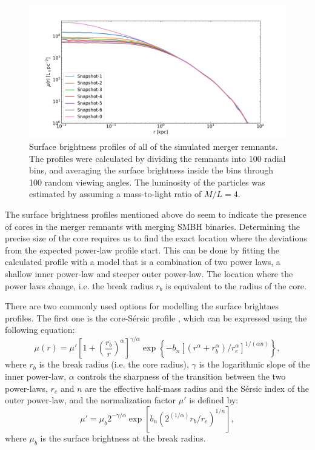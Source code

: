 \documentclass[english, oneside]{HYgradu}
\begin{document}
\begin{figure}[h]
	\centering
	\includegraphics[width=\textwidth]{SurfaceBrightnessProfiles.png}
	\caption{Surface brightness profiles of all of the simulated merger remnants. The profiles were calculated by dividing the remnants into 100 radial bins, and averaging the surface brightness inside the bins through 100 random viewing angles. The luminosity of the particles was estimated by assuming a mass-to-light ratio of $M/L = 4$.}
	\label{figure:surface_brightness}
\end{figure}

The surface brightness profiles mentioned above do seem to indicate the presence of cores in the merger remnants with merging SMBH binaries. Determining the precise size of the core requires us to find the exact location where the deviations from the expected power-law profile start. This can be done by fitting the calculated profile with a model that is a combination of two power laws, a shallow inner power-law and steeper outer power-law. The location where the power laws change, i.e. the break radius $r_b$ is equivalent to the radius of the core. 

There are two commonly used options for modelling the surface brightnes profiles. The first one is the core-Sérsic profile \citep{Graham2003}, which can be expressed using the following equation:
\begin{equation}
\mu(r) = \mu' \left[ 1 + \left( \frac{r_b}{r} \right)^\alpha \right]^{\gamma / \alpha} \exp \left\lbrace -b_n \left[ \left( r^\alpha + r_b^\alpha \right) / r_e^\alpha \right]^{1/(\alpha n)} \right\rbrace, \label{eq:core-sersic}
\end{equation}
where $r_b$ is the break radius (i.e. the core radius), $\gamma$ is the logarithmic slope of the inner power-law, $\alpha$ controls the sharpness of the transition between the two power-laws, $r_e$ and $n$ are the effective half-mass radius and the Sérsic index of the outer power-law, and the normalization factor $\mu'$ is defined by:
\begin{equation}
\mu' = \mu_b 2^{-\gamma/\alpha} \exp \left[ b_n \left( 2^(1/\alpha) r_b/r_e \right)^{1/n} \right], 
\label{eq:mu_dot}
\end{equation}
where $\mu_b$ is the surface brightness at the break radius. 
\end{document}

